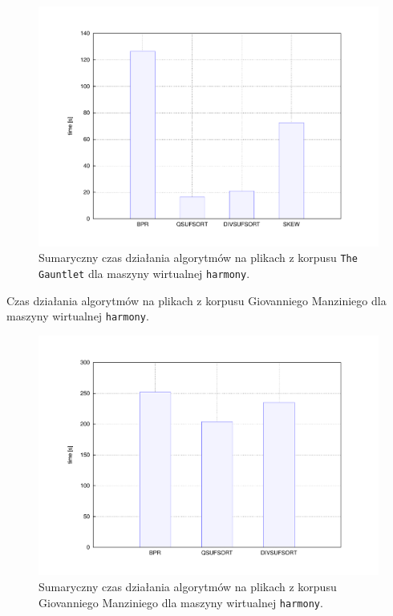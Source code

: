 \begin{figure}[p]
       \begin{center}
            \includegraphics[width=\linewidth]{figures/results/harmony-gauntlet.pdf}
        \end{center}        
	    \caption{Sumaryczny czas działania algorytmów na plikach z korpusu \texttt{The Gauntlet} dla maszyny wirtualnej \texttt{harmony}.}%
    \label{rys:harmony-gauntlet}
\end{figure} 


\begin{table}[p]
	\begin{center}        
 		 
    \end{center}                         
	\caption{Czas działania algorytmów na plikach z korpusu Giovanniego Manziniego dla maszyny wirtualnej \texttt{harmony}.}%
    \label{tab:harmony-manzini}
\end{table}

\begin{figure}[p]
       \begin{center}
            \includegraphics[width=\linewidth]{figures/results/harmony-manzini.pdf}
        \end{center}        
	    \caption{Sumaryczny czas działania algorytmów na plikach z korpusu Giovanniego Manziniego dla maszyny wirtualnej \texttt{harmony}.}%
    \label{rys:harmony-manzini}
\end{figure}
 